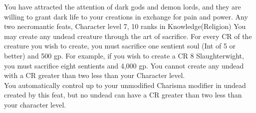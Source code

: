 \shortdescfeat
{You have attracted the attention of dark gods and demon lords, and they are willing to grant dark life to your creations in exchange for pain and power.}
{Any two necromantic feats, Character level 7, 10 ranks in Knowledge(Religion)}
{You may create any undead creature through the art of sacrifice. For every CR of the creature you wish to create, you must sacrifice one sentient soul (Int of 5 or better) and 500 gp. For example, if you wish to create a CR 8 Slaughterwight, you must sacrifice eight sentients and 4,000 gp. You cannot create any undead with a CR greater than two less than your Character level.\\
You automatically control up to your unmodified Charisma modifier in undead created by this feat, but no undead can have a CR greater than two less than your character level.}

